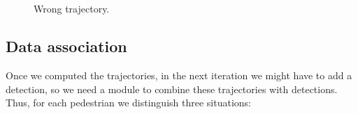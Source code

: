 \begin{figure}[H]
		
\centering

\\
\\
\caption{Wrong trajectory.}
\label{motion2nocoorrect}
\end{figure}













\subsection{Data association}

Once we computed the trajectories, in the next iteration we might have to add a detection, so we need a module to combine these trajectories with detections. Thus, for each pedestrian we distinguish three situations:

